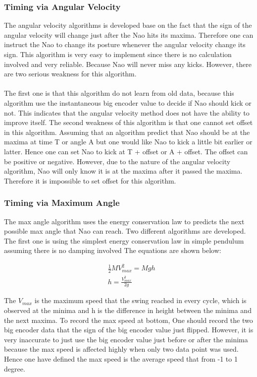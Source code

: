 \documentclass[11pt]{article}
\newcommand*\ruleline[1]{\par\noindent\raisebox{.8ex}{\makebox[\linewidth]{\hrulefill\hspace{1ex}\raisebox{-.8ex}{#1}\hspace{1ex}\hrulefill}}}
\begin{document}
\subsubsection{Timing via Angular Velocity}
\ruleline{Chenglong Li}
The angular velocity algorithms is developed base on the fact that the sign of the angular velocity will change just after the Nao hits its maxima. Therefore one can instruct the Nao to change its posture whenever the angular velocity change its sign. This algorithm is very easy to implement since there is no calculation involved and very reliable. Because Nao will never miss any kicks. However, there are two serious weakness for this algorithm. 
\\
\\
The first one is that this algorithm do not learn from old data, because this algorithm use the instantaneous big encoder value to decide if Nao should kick or not. This indicates that the angular velocity method does not have the ability to improve itself. The second weakness of this algorithm is that one cannot set offset in this algorithm. Assuming that an algorithm predict that Nao should be at the maxima at time T or angle A but one would like Nao to kick a little bit earlier or latter. Hence one can set Nao to kick at T + offset or A + offset. The offset can be positive or negative. However, due to the nature of the angular velocity algorithm, Nao will only know it is at the maxima after it passed the maxima. Therefore it is impossible to set offset for this algorithm. 

\subsubsection{Timing via Maximum Angle}
The max angle algorithm uses the energy conservation law to predicts the next possible max angle that Nao can reach. Two different algorithms are developed. The first one is using the simplest energy conservation law in simple pendulum assuming there is no damping involved The equations are shown below:

\begin{align}
    &\frac{1}{2}MV_{max}^2 = Mgh\\
    & h = \frac{V_{max}^2}{2g}
\end{align}

The $V_{max}$ is the maximum speed that the swing reached in every cycle, which is observed at the minima and h is the difference in height between the minima and the next maxima. To record the max speed at bottom, One should record the two big encoder data that the sign of the big encoder value just flipped. However, it is very inaccurate to just use the big encoder value just before or after the minima because the max speed is affected highly when only two data point was used. Hence one have defined the max speed is the average speed that from -1 to 1 degree.
\\
\\
\end{document}
